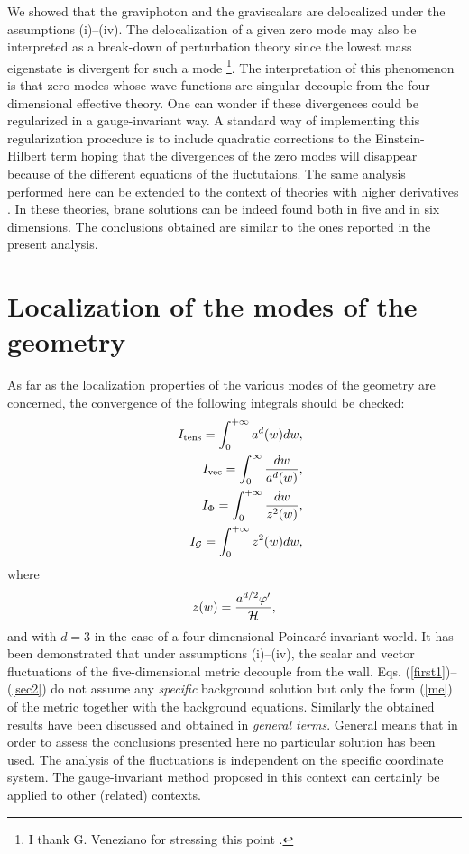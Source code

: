\documentclass[a4paper,12pt]{article}
\begin{document}
We showed that the graviphoton and the graviscalars are delocalized 
under the assumptions (i)--(iv). The delocalization of a given 
zero mode may also be interpreted as a break-down of perturbation theory
since the lowest mass eigenstate is divergent for such a mode 
\footnote{ I thank G. Veneziano for stressing this point \cite{GV}.}. 
The interpretation of this phenomenon is that zero-modes whose 
wave functions are singular decouple from the four-dimensional 
effective theory. One can wonder if these divergences could be 
regularized in a gauge-invariant way. A standard way of implementing 
this regularization procedure is to include quadratic 
corrections to the Einstein-Hilbert term hoping that 
the divergences of the zero modes will disappear because of the 
different equations of the fluctutaions.
The same analysis performed here can be extended to the context of 
theories with higher derivatives \cite{n3}. In these theories, 
brane solutions can be indeed found both in five \cite{n3,z} 
and in six dimensions\cite{gm,hh}.
The  conclusions obtained are similar to the ones reported in the
present analysis.


\renewcommand{\theequation}{4.\arabic{equation}}
\setcounter{equation}{0}
\section{Localization of the modes of the geometry} 
As far as the localization properties 
of the various modes of the geometry are concerned, 
the convergence of the following integrals should 
be checked:
\begin{eqnarray}
&& I_{{\rm tens}}= \int_{0}^{+\infty} a^d(w) dw,
\label{first1}\\
&& I_{\rm vec} =
\int_{0}^{\infty} \frac{d w}{a^d(w)} ,
\label{first2}\\
&& I_{\Phi}= \int_{0}^{+\infty} \frac{dw}{z^2(w)},
\label{sec1}\\ 
&& I_{{\cal G}}=\int_{0}^{+\infty} z^{2}(w) dw,
\label{sec2}
\end{eqnarray}
where 
\begin{equation}
z(w) = \frac{a^{d/2} \varphi'}{{\cal H}},
\end{equation}
and with $d=3$ in the case of a four-dimensional Poincar\'e invariant 
world.
It has been demonstrated that under 
assumptions (i)--(iv), the scalar and vector fluctuations
 of the five-dimensional metric decouple from the wall. 
Eqs. (\ref{first1})--(\ref{sec2}) do not assume 
any {\em specific} background solution
but only the form (\ref{me}) of the metric 
together with the background equations. Similarly
the obtained results have been 
discussed and obtained in {\em general terms}.
General means that in order to assess the conclusions presented 
here no particular solution has been used. 
The analysis  of the fluctuations is independent 
on the specific coordinate system. The gauge-invariant method 
proposed in this context can certainly be applied to
other (related) contexts.
\end{document}
